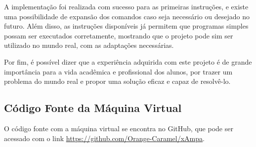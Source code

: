 \documentclass[
	12pt,				%
	oneside,			%
	a4paper,			%
	english,			%
	french,				%
	spanish,			%
	brazil				%
	]{abntex2}
\begin{document}
A implementação foi realizada com sucesso para as primeiras instruções, e existe uma possibilidade de expansão dos comandos caso seja necessário ou desejado no futuro. Além disso, as instruções disponíveis já permitem que programas simples possam ser executados corretamente, mostrando que o projeto pode sim ser utilizado no mundo real, com as adaptações necessárias.

Por fim, é possível dizer que a experiência adquirida com este projeto é de grande importância para a vida acadêmica e profissional dos alunos, por trazer um problema do mundo real e propor uma solução eficaz e capaz de resolvê-lo.


\postextual




\begin{anexosenv}


\chapter{Código Fonte da Máquina Virtual}
O código fonte com a máquina virtual se encontra no GitHub, que pode ser acessado com o link \url{https://github.com/Orange-Caramel/xAmpa}.





\end{anexosenv}

\printindex
\end{document}
